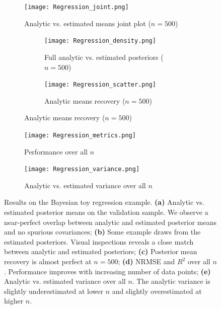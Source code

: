 \documentclass[9pt,twoside,lineno]{pnas-new}
\begin{document}
\begin{figure}[H]
\centering
\begin{subfigure}{.49\textwidth}
    \texttt{[image: Regression\_joint.png]}
    \caption{Analytic vs. estimated means joint plot ($n=500$)}
    \label{fig:Fig.3a}
\end{subfigure}
\begin{subfigure}{.49\textwidth}
	\begin{subfigure}{.95\textwidth}
 		\texttt{[image: Regression\_density.png]}
    	\caption{Full analytic vs. estimated posteriors ($n=500$)}
    \label{fig:Fig.3b}
	\end{subfigure}
	\begin{subfigure}{.95\textwidth}
 		\texttt{[image: Regression\_scatter.png]}
    	\caption{Analytic means recovery ($n=500$)}
    \label{fig:Fig.3c}
	\end{subfigure}
\end{subfigure}
\begin{subfigure}{.47\textwidth}
 		\texttt{[image: Regression\_metrics.png]}
    	\caption{Performance over all $n$}
    \label{fig:Fig.3d}
\end{subfigure}
\begin{subfigure}{.52\textwidth}
 		\texttt{[image: Regression\_variance.png]}
    	\caption{Analytic vs. estimated variance over all $n$}
    \label{fig:Fig.3e}
\end{subfigure}
\caption[short]{Results on the Bayesian toy regression example. \textbf{(a)} Analytic vs. estimated posterior means on the validation sample. We observe a near-perfect overlap between analytic and estimated posterior means and no spurious covariances; \textbf{(b)} Some example draws from the estimated posteriors. Visual inspections reveals a close match between analytic and estimated posteriors; \textbf{(c)} Posterior mean recovery is almost perfect at $n=500$; \textbf{(d)} NRMSE and $R^{2}$ over all $n$. Performance improves with increasing number of data points; \textbf{(e)} Analytic vs. estimated variance over all $n$. The analytic variance is slightly underestimated at lower $n$ and slightly overestimated at higher $n$.} \label{fig:Fig.3}
\end{figure}
\end{document}
